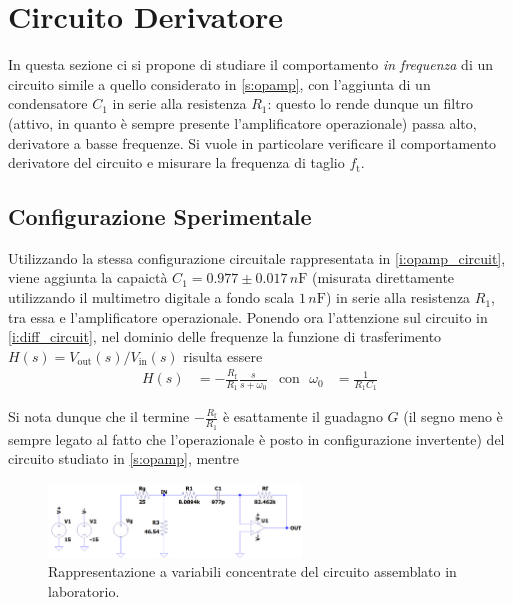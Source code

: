 \documentclass[a4paper,11pt]{article} %
\begin{document}

\section{Circuito Derivatore}
In questa sezione ci si propone di studiare il comportamento \textit{in frequenza} di un circuito simile a quello
considerato in \autoref{s:opamp}, con l'aggiunta di un condensatore $C_{1}$ in serie alla resistenza $R_{1}$: questo lo
rende dunque un filtro (attivo, in quanto è sempre presente l'amplificatore operazionale) passa alto, derivatore a basse
frequenze. Si vuole in particolare verificare il comportamento derivatore del circuito e misurare la frequenza di taglio
$f_{\text{t}}$.



\subsection{Configurazione Sperimentale}
Utilizzando la stessa configurazione circuitale rappresentata in \autoref{i:opamp_circuit}, viene aggiunta la capaictà
$C_{1} = 0.977 \pm 0.017 \,\si{n\farad}$ (misurata direttamente utilizzando il multimetro digitale a fondo scala
$1\,\si{n\farad}$) in serie alla resistenza $R_{1}$, tra essa e l'amplificatore operazionale. Ponendo ora l'attenzione
sul circuito in \autoref{i:diff_circuit}, nel dominio delle frequenze
la funzione di trasferimento $H(s)=V_{\text{out}}(s)/V_{\text{in}}(s)$ risulta essere 
\begin{align}
	H(s) &= -\frac{R_{\text{f}}}{R_{1}}\frac{s}{s+\omega_{0}} & \text{con}\,\,\,\, \omega_{0}&=\frac{1}{R_{1}C_{1}}
\end{align}

\noindent Si nota dunque che il termine $-\frac{R_{\text{f}}}{R_{1}}$ è esattamente il guadagno $G$ (il segno meno è
sempre legato al fatto che l'operazionale è posto in configurazione invertente) del circuito studiato in
\autoref{s:opamp}, mentre

\begin{figure}
	\centering
	\includegraphics[width=0.6\textwidth]{../Simulations/Differentiator/circuit_image_big.png}
	\caption{\footnotesize Rappresentazione a variabili concentrate del circuito assemblato in laboratorio.}
	\label{i:diff_circuit}
\end{figure}
\end{document}
